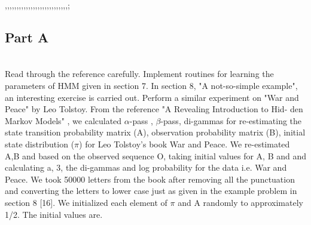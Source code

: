 ,,,,,,,,,,,,,,,,,,,,,,,,,,,;\documentclass[conference]{IEEEtran}
\begin{document}
\subsection{Part A}
\\
  Read through the reference carefully. Implement routines for
learning the parameters of HMM given in section 7. In section
8, "A not-so-simple example", an interesting exercise is carried
out. Perform a similar experiment on "War and Peace" by Leo
Tolstoy.
From the reference "A Revealing Introduction to Hid-
den Markov Models" \cite{b10}, we calculated 	$\alpha$-pass , $\beta$-pass,
di-gammas for re-estimating the state transition probability
matrix (A), observation probability matrix (B), initial state
distribution ($\pi$) for Leo Tolstoy's book War and Peace. We
re-estimated A,B and based on the observed sequence O,
taking initial values for A, B and and calculating a, 3, the
di-gammas and log probability for the data i.e. War and Peace.
We took 50000 letters from the book after removing all the
punctuation and converting the letters to lower case just as
given in the example problem in section 8 [16]. We initialized
each element of $\pi$ and A randomly to approximately 1/2. The initial 
values are.
\end{document}
